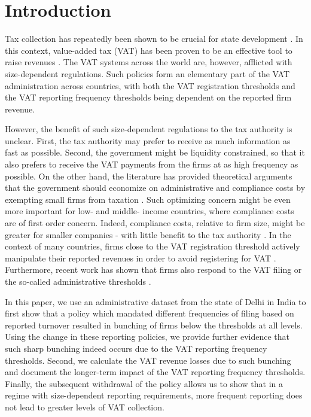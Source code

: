 \section{Introduction}
Tax collection has repeatedly been shown to be crucial for state development \citep{besley2014developing}. In this context, value-added tax (VAT) has been proven to be an effective tool to raise revenues \citep{keen2006vat}. The VAT systems across the world are, however, afflicted with size-dependent regulations. Such policies form an elementary part of the VAT administration across countries, with both the VAT registration thresholds and the VAT reporting frequency thresholds being dependent on the reported firm revenue.

However, the benefit of such size-dependent regulations to the tax authority is unclear. First, the tax authority may prefer to receive as much information as fast as possible. Second, the government might be liquidity constrained, so that it also prefers to receive the VAT payments from the firms at as high frequency as possible. On the other hand, the literature has provided theoretical arguments that the government should economize on administrative and compliance costs by exempting small firms from taxation \citep{dharmapala2011tax}. Such optimizing concern might be even more important for low- and middle- income countries, where compliance costs are of first order concern. Indeed,  compliance costs, relative to firm size, might be greater for smaller companies - with little benefit to the tax authority \citep{internationaltaxdialogue2007,internationaltaxdialogue2013}. In the context of many countries, firms close to the VAT registration threshold actively manipulate their reported revenues in order to avoid registering for VAT \citep{onji2009response,gebresilasse2016firm,liu2017vat,harju2016effects, boonzaaier2017small}. Furthermore, recent work has shown that firms also respond to the VAT filing or the so-called administrative thresholds \citep{asatryan2017responses}. 

In this paper, we use an administrative dataset from the state of Delhi in India to first show that a policy which mandated different frequencies of filing based on reported turnover resulted in bunching of firms below the thresholds at all levels. Using the change in these reporting policies, we provide further evidence that such sharp bunching indeed occurs due to the VAT reporting frequency thresholds. Second, we calculate the VAT revenue losses due to such bunching and document the longer-term impact of the VAT reporting frequency thresholds. Finally, the subsequent withdrawal of the policy allows us to show that in a regime with size-dependent reporting requirements, more frequent reporting does not lead to greater levels of VAT collection.


